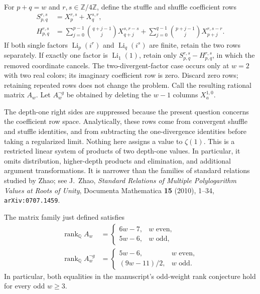 For $p+q=w$ and $r,s\in\mathbb Z/4\mathbb Z$, define the stuffle and
shuffle coefficient rows
\begin{align}
 S_{p,q}^{r,s}
 &=X_p^{r,s}+X_q^{s,r},\\
 H_{p,q}^{r,s}
 &=\sum_{j=0}^{p-1}\binom{q+j-1}{j}X_{q+j}^{s,r-s}
   +\sum_{j=0}^{q-1}\binom{p+j-1}{j}X_{p+j}^{r,s-r}.
 \label{fg:eq:raw-rows}
\end{align}
If both single factors $\operatorname{Li}_p(i^r)$ and
$\operatorname{Li}_q(i^s)$ are finite, retain the two rows separately.
If exactly one factor is $\operatorname{Li}_1(1)$, retain only
$S_{p,q}^{r,s}-H_{p,q}^{r,s}$, in which the removed coordinate cancels.
The two-divergent-factor case occurs only at $w=2$ with two real colors;
its imaginary coefficient row is zero. Discard zero rows; retaining
repeated rows does not change the problem. Call the resulting rational
matrix $A_w$. Let $A_w^{\neg g}$ be obtained by deleting the $w-1$
columns $X_a^{1,0}$.

The depth-one right sides are suppressed because the present question
concerns the coefficient row space. Analytically, these rows come from
convergent shuffle and stuffle identities, and from subtracting the
one-divergence identities before taking a regularized limit. Nothing
here assigns a value to $\zeta(1)$. This is a restricted linear system
of products of two depth-one values. In particular, it omits distribution,
higher-depth products and elimination, and additional argument
transformations. It is narrower than the families of standard relations
studied by Zhao; see J.~Zhao, \emph{Standard Relations of Multiple
Polylogarithm Values at Roots of Unity}, Documenta Mathematica
\textbf{15} (2010), 1--34, \texttt{arXiv:0707.1459}.

\begin{theorem}\label{fg:thm:rank}
The matrix family just defined satisfies
\begin{align}
 \operatorname{rank}_{\mathbb Q}A_w
 &=\begin{cases}
      6w-7,&w\text{ even},\\
      5w-6,&w\text{ odd},
    \end{cases}\label{fg:eq:full-rank}\\
 \operatorname{rank}_{\mathbb Q}A_w^{\neg g}
 &=\begin{cases}
      5w-6,&w\text{ even},\\
      (9w-11)/2,&w\text{ odd}.
    \end{cases}\label{fg:eq:nong-rank}
\end{align}
In particular, both equalities in the manuscript's odd-weight rank
conjecture hold for every odd $w\ge3$.
\end{theorem}

